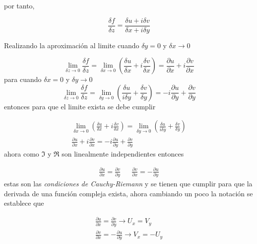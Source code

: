     por tanto,

    \begin{equation*}
        \frac{\delta f}{\delta z} = \frac{\delta u + i\delta v}{\delta x + i\delta y}
    \end{equation*}
    
    Realizando la aproximación al limite cuando $\delta y = 0$ y $\delta x \rightarrow 0$

    \begin{equation*}
        \lim_{\delta z \rightarrow 0}  \frac{\delta f}{\delta z} = \lim_{\delta x \rightarrow 0} \left(\frac{\delta u}{\delta x}+ i\frac{ \delta v}{\delta x}\right) = \frac{\partial u}{\partial x} + i \frac{\partial v}{\partial x}
    \end{equation*}
    para cuando $\delta x = 0$ y $\delta y \rightarrow 0$ 
    \begin{equation*}
        \lim_{\delta z \rightarrow 0}  \frac{\delta f}{\delta z} = \lim_{\delta y \rightarrow 0} \left(\frac{\delta u}{i\delta y}+ \frac{ \delta v}{\delta y}\right) = - i\frac{\partial u}{\partial y} + \frac{\partial v}{\partial y}
    \end{equation*}
    entonces para que el limite exista se debe cumplir

    \begin{gather*}
        \lim_{\delta x \rightarrow 0} \left(\frac{\delta u}{\delta x}+ i\frac{ \delta v}{\delta x}\right) = \lim_{\delta y \rightarrow 0} \left(\frac{\delta u}{i\delta y}+ \frac{ \delta v}{\delta y}\right)\\
        \frac{\partial u}{\partial x} + i \frac{\partial v}{\partial x} = - i\frac{\partial u}{\partial y} + \frac{\partial v}{\partial y}
    \end{gather*}
    ahora como $\Im$ y $\Re$ son linealmente independientes entonces 

    \begin{align*}
        \frac{\partial u}{\partial x} =  \frac{\partial v}{\partial y} && \frac{\partial v}{\partial x} = - \frac{\partial u}{\partial y}
    \end{align*}
    estas son las \textit{condiciones de Cauchy-Riemann} y se tienen que cumplir para que la derivada de una función compleja exista, ahora cambiando un poco la notación se establece que

    \begin{gather*}
        \frac{\partial u}{\partial x} =  \frac{\partial v}{\partial y}  \longrightarrow  U_x = V_y\\
        \frac{\partial v}{\partial x} =  -\frac{\partial u}{\partial y}  \longrightarrow  V_x = -U_y\\
    \end{gather*}

